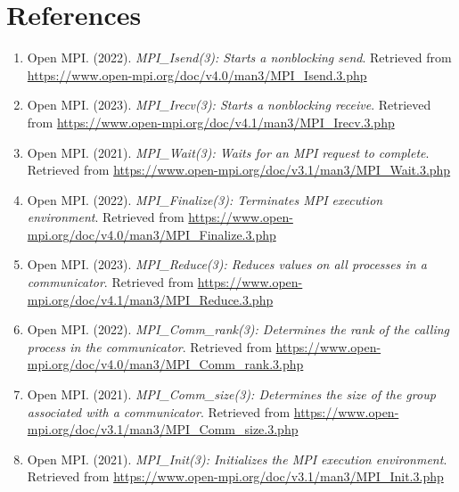 \documentclass[11pt]{article}
\begin{document}
\section{References}
\begin{enumerate}
    \item Open MPI. (2022). \textit{MPI\_Isend(3): Starts a nonblocking send}. Retrieved from \url{https://www.open-mpi.org/doc/v4.0/man3/MPI_Isend.3.php} \label{ref:MPI_Isend}
    \item Open MPI. (2023). \textit{MPI\_Irecv(3): Starts a nonblocking receive}. Retrieved from \url{https://www.open-mpi.org/doc/v4.1/man3/MPI_Irecv.3.php} \label{ref:MPI_Irecv}
    \item Open MPI. (2021). \textit{MPI\_Wait(3): Waits for an MPI request to complete}. Retrieved from \url{https://www.open-mpi.org/doc/v3.1/man3/MPI_Wait.3.php} \label{ref:MPI_Wait}
    \item Open MPI. (2022). \textit{MPI\_Finalize(3): Terminates MPI execution environment}. Retrieved from \url{https://www.open-mpi.org/doc/v4.0/man3/MPI_Finalize.3.php} \label{ref:MPI_Finalize}
    \item Open MPI. (2023). \textit{MPI\_Reduce(3): Reduces values on all processes in a communicator}. Retrieved from \url{https://www.open-mpi.org/doc/v4.1/man3/MPI_Reduce.3.php} \label{ref:reduce}
    \item Open MPI. (2022). \textit{MPI\_Comm\_rank(3): Determines the rank of the calling process in the communicator}. Retrieved from \url{https://www.open-mpi.org/doc/v4.0/man3/MPI_Comm_rank.3.php} \label{ref:comm_rank}
    \item Open MPI. (2021). \textit{MPI\_Comm\_size(3): Determines the size of the group associated with a communicator}. Retrieved from \url{https://www.open-mpi.org/doc/v3.1/man3/MPI_Comm_size.3.php} \label{ref:comm_size}
    \item Open MPI. (2021). \textit{MPI\_Init(3): Initializes the MPI execution environment}. Retrieved from \url{https://www.open-mpi.org/doc/v3.1/man3/MPI_Init.3.php} \label{ref:init}

\end{enumerate}
\end{document}
